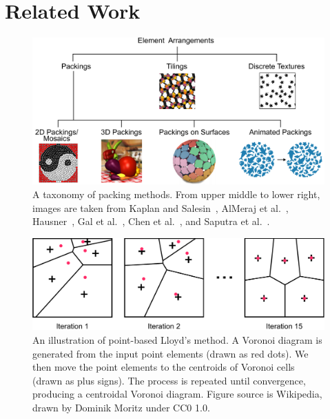 
\chapter{Related Work}
\label{chapter_related_work}

\begin{figure}
\centering
\includegraphics[width=1.0\textwidth]{figures/related/taxonomy.pdf} 
\caption[A taxonomy of packing methods]
{\label{fig_taxonomy} 
\nnewtext
{
A taxonomy of packing methods.
From upper middle to lower right, images are taken from 
Kaplan and Salesin~\cite{Kaplan2000}, 
AlMeraj et al.~\cite{AlMeraj2013},
Hausner~\cite{Hausner2001},
Gal et al.~\cite{Gal2007B}, 
Chen et al.~\cite{Chen2017}, 
and Saputra et al.~\cite{Saputra2020}.
}
}
\end{figure}


\begin{figure}
\centering
\includegraphics[width=1.0\textwidth]{figures/related/lloyds_method.pdf} 
\caption[An illustration of Lloyd's method.]
{\label{fig_lloyds_method} 
\newtext
{
An illustration of point-based Lloyd's method.
A Voronoi diagram is generated from the input point elements (drawn as red dots).
We then move the point elements to the centroids of Voronoi cells (drawn as plus signs).
The process is repeated until convergence, producing a centroidal Voronoi diagram.
Figure source is Wikipedia, drawn by Dominik Moritz under CC0 1.0.
}
}
\end{figure}


